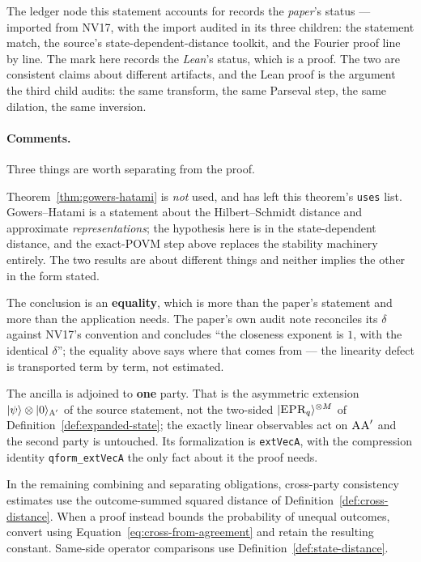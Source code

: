 The ledger node this statement accounts for records the \emph{paper}'s status --- imported from
NV17, with the import audited in its three children: the statement match, the source's
state-dependent-distance toolkit, and the Fourier proof line by line. The mark here records the
\emph{Lean}'s status, which is a proof. The two are consistent claims about different artifacts, and
the Lean proof is the argument the third child audits: the same transform, the same Parseval step,
the same dilation, the same inversion.

\paragraph{Comments.} Three things are worth separating from the proof.

Theorem~\ref{thm:gowers-hatami} is \emph{not} used, and has left this theorem's \texttt{uses} list.
Gowers--Hatami is a statement about the Hilbert--Schmidt distance and approximate
\emph{representations}; the hypothesis here is in the state-dependent distance, and the
exact-POVM step above replaces the stability machinery entirely. The two results are about
different things and neither implies the other in the form stated.

The conclusion is an \textbf{equality}, which is more than the paper's statement and more than the
application needs. The paper's own audit note reconciles its $\delta$ against NV17's convention and
concludes ``the closeness exponent is $1$, with the identical $\delta$''; the equality above says
where that comes from --- the linearity defect is transported term by term, not estimated.

The ancilla is adjoined to \textbf{one} party. That is the asymmetric extension
$|\psi\rangle \otimes |0\rangle_{\textsc{A}'}$ of the source statement, not the two-sided
$|\textsc{EPR}_q\rangle^{\otimes M}$ of Definition~\ref{def:expanded-state}; the exactly linear observables act
on $\textsc{A} \textsc{A}'$ and the second party is untouched. Its formalization is \texttt{extVecA}, with
the compression identity \texttt{qform\_extVecA} the only fact about it the proof needs.

\effortHard

In the remaining combining and separating obligations, cross-party
consistency estimates use the outcome-summed squared distance of
Definition~\ref{def:cross-distance}. When a proof instead bounds the
probability of unequal outcomes, convert using
Equation~\ref{eq:cross-from-agreement} and retain the resulting constant.
Same-side operator comparisons use Definition~\ref{def:state-distance}.


